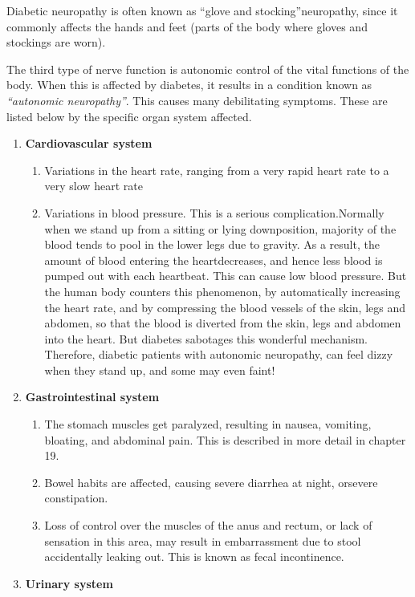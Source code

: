 Diabetic neuropathy is often known as “glove and stocking”\break neuropathy, since it commonly affects the hands and feet (parts of the body where gloves and stockings are worn).

The third type of nerve function is autonomic control of the vital functions of the body. When this is affected by diabetes, it results in a condition known as \textit{“autonomic neuropathy”}. This causes many debilitating symptoms. These are listed below by the specific organ system affected.
\begin{enumerate}[•]
\itemsep=0pt
\item \textbf{Cardiovascular system}
\begin{enumerate}[o]
\itemsep=0pt
\item Variations in the heart rate, ranging from a very rapid heart rate to a very slow heart rate
\item Variations in blood pressure. This is a serious complication.\break Normally when we stand up from a sitting or lying down\break position, majority of the blood tends to pool in the lower legs due to gra\-vity. As a result, the amount of blood entering the heart\break decreases, and hence less blood is pumped out with each heartbeat. This can cause low blood pressure. But the human body counters this pheno\-menon, by automatically increasing the heart rate, and by compressing the blood vessels of the skin, legs and abdomen, so that the blood is diverted from the skin, legs and abdomen into the heart. But diabetes sabotages this wonderful mechanism. Therefore, diabetic patients with autonomic neuro\-pathy, can feel dizzy when they stand up, and some may even faint!
\end{enumerate}
\item \textbf{Gastrointestinal system}
\begin{enumerate}[o]
\itemsep=0pt
\item The stomach muscles get paralyzed, resulting in nausea, vomiting, bloating, and abdominal pain. This is described in more detail in chapter 19.
\item Bowel habits are affected, causing severe diarrhea at night, or\break severe constipation.
\item Loss of control over the muscles of the anus and rectum, or lack of sensation in this area, may result in embarrassment due to stool accidentally leaking out. This is known as fecal incontinence.
\end{enumerate}
\item \textbf{Urinary system}

\end{enumerate}
